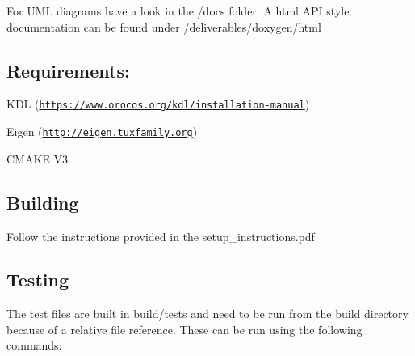For U\+ML diagrams have a look in the /docs folder. A html A\+PI style documentation can be found under /deliverables/doxygen/html

\subsection*{Requirements\+:}


\begin{DoxyItemize}
\item K\+DL (\href{https://www.orocos.org/kdl/installation-manual}{\tt https\+://www.\+orocos.\+org/kdl/installation-\/manual})
\item Eigen (\href{http://eigen.tuxfamily.org}{\tt http\+://eigen.\+tuxfamily.\+org})
\item C\+M\+A\+KE V3.
\end{DoxyItemize}

\subsection*{Building}

Follow the instructions provided in the setup\+\_\+instructions.\+pdf

\subsection*{Testing}

The test files are built in build/tests and need to be run from the build directory because of a relative file reference. These can be run using the following commands\+: 
 